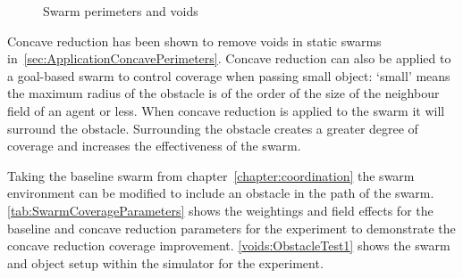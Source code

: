 \begin{figure}[H]
\centering
{}
\caption{Swarm perimeters and voids}
\label{fig:SwarmObjectVoids}
\end{figure}
 
Concave reduction has been shown to remove voids in static swarms in~\autoref{sec:ApplicationConcavePerimeters}. Concave reduction can also be applied to a goal-based swarm to control coverage when passing small object: `small' means the maximum radius of the obstacle is of the order of the size of the neighbour field of an agent or less. When concave reduction is applied to the swarm it will surround the obstacle. Surrounding the obstacle creates a greater degree of coverage and increases the effectiveness of the swarm.

Taking the baseline swarm from chapter~\ref{chapter:coordination} the swarm environment can be modified to include an obstacle in the path of the swarm. \autoref{tab:SwarmCoverageParameters} shows the weightings and field effects for the baseline and concave reduction parameters for the experiment to demonstrate the concave reduction coverage improvement. \autoref{voids:ObstacleTest1} shows the swarm and object setup within the simulator for the experiment.

